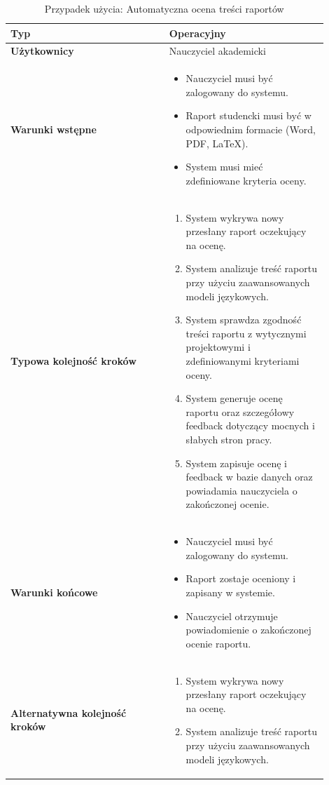 \documentclass[a4paper, 12pt]{article}
\begin{document}
\begin{table}[H]
\footnotesize
\centering
\caption{Przypadek użycia: Automatyczna ocena treści raportów}
\begin{tabular}{|p{0.45\linewidth}|p{0.45\linewidth}|}
\hline
\textbf{Typ} & Operacyjny \\
\hline
\textbf{Użytkownicy} & Nauczyciel akademicki \\
\hline
\textbf{Warunki wstępne} & 
\begin{itemize}
    \item Nauczyciel musi być zalogowany do systemu.
    \item Raport studencki musi być w odpowiednim formacie (Word, PDF, LaTeX).
    \item System musi mieć zdefiniowane kryteria oceny.
\end{itemize} \\
\hline
\textbf{Typowa kolejność kroków} &
\begin{enumerate}
    \item System wykrywa nowy przesłany raport oczekujący na ocenę.
    \item System analizuje treść raportu przy użyciu zaawansowanych modeli językowych.
    \item System sprawdza zgodność treści raportu z wytycznymi projektowymi i zdefiniowanymi kryteriami oceny.
    \item System generuje ocenę raportu oraz szczegółowy feedback dotyczący mocnych i słabych stron pracy.
    \item System zapisuje ocenę i feedback w bazie danych oraz powiadamia nauczyciela o zakończonej ocenie.
\end{enumerate} \\
\hline
\textbf{Warunki końcowe} & 
\begin{itemize}
    \item Nauczyciel musi być zalogowany do systemu.
    \item Raport zostaje oceniony i zapisany w systemie.
    \item Nauczyciel otrzymuje powiadomienie o zakończonej ocenie raportu.
\end{itemize} \\
\hline
\textbf{Alternatywna kolejność kroków} &
\begin{enumerate}
    \item System wykrywa nowy przesłany raport oczekujący na ocenę.
    \item System analizuje treść raportu przy użyciu zaawansowanych modeli językowych.

\end{enumerate}
\end{tabular}
\end{table}
\end{document}
